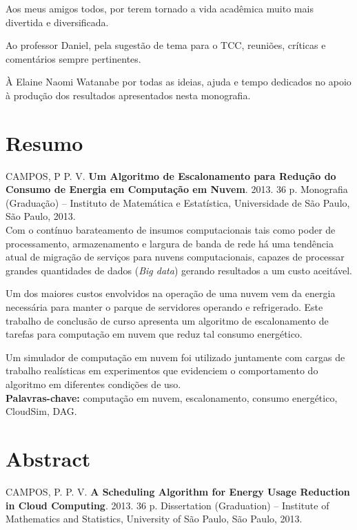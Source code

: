 \documentclass[11pt,twoside,a4paper]{book}
\begin{document}
Aos meus amigos todos, por terem tornado a vida acadêmica muito mais divertida e
diversificada.

Ao professor Daniel, pela sugestão de tema para o TCC, reuniões, críticas e
comentários sempre pertinentes.

À Elaine Naomi Watanabe por todas as ideias, ajuda e tempo dedicados no apoio à
produção dos resultados apresentados nesta monografia.


\chapter*{Resumo}

\noindent CAMPOS, P P. V. \textbf{Um Algoritmo de Escalonamento para Redução do
Consumo de Energia em Computação em Nuvem}. 
2013. 36 p. %
Monografia (Graduação) -- Instituto de Matemática e Estatística,
Universidade de São Paulo, São Paulo, 2013.\\

Com o contínuo barateamento de insumos computacionais tais como poder de
processamento, armazenamento e largura de banda de rede há uma tendência atual
de migração de serviços para nuvens computacionais, capazes de processar grandes
quantidades de dados (\emph{Big data}) gerando resultados a um custo
aceitável.

Um dos maiores custos envolvidos na operação de uma nuvem vem da energia
necessária para manter o parque de servidores operando e refrigerado. Este
trabalho de conclusão de curso apresenta um algoritmo
de escalonamento de tarefas para computação em nuvem que reduz tal consumo
energético.

Um simulador de computação em nuvem foi utilizado juntamente com cargas de
trabalho realísticas em experimentos que evidenciem o comportamento do
algoritmo em diferentes condições de uso.\\


\noindent \textbf{Palavras-chave:} computação em nuvem, escalonamento, consumo
energético, CloudSim, DAG.

\chapter*{Abstract}
\noindent CAMPOS, P. P. V. \textbf{A Scheduling Algorithm for Energy Usage 
Reduction in Cloud Computing}.
2013. 36 p.
Dissertation (Graduation) -- Institute of Mathematics and Statistics,
University of São Paulo, São Paulo, 2013.\\
\end{document}
